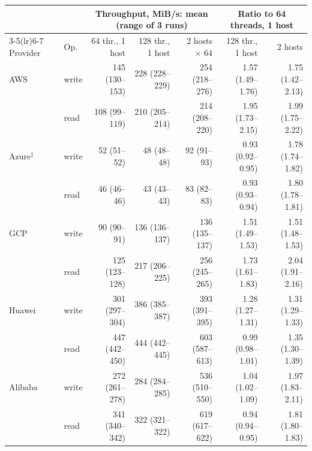 \begin{tabular}{llrrrrr}
\toprule
 & & \multicolumn{3}{c}{Throughput, MiB/s: mean (range of 3 runs)} & \multicolumn{2}{c}{Ratio to 64 threads, 1 host} \\
\cmidrule(lr){3-5}\cmidrule(lr){6-7}
Provider & Op. & 64 thr., 1 host & 128 thr., 1 host & 2 hosts $\times$ 64 & 128 thr., 1 host & 2 hosts \\
\midrule
AWS & write & 145 (130--153) & 228 (228--229) & 254 (218--276) & 1.57 (1.49--1.76) & 1.75 (1.42--2.13) \\
 & read & 108 (99--119) & 210 (205--214) & 214 (208--220) & 1.95 (1.73--2.15) & 1.99 (1.75--2.22) \\
Azure$^{\ddagger}$ & write & 52 (51--52) & 48 (48--48) & 92 (91--93) & 0.93 (0.92--0.95) & 1.78 (1.74--1.82) \\
 & read & 46 (46--46) & 43 (43--43) & 83 (82--83) & 0.93 (0.93--0.94) & 1.80 (1.78--1.81) \\
GCP & write & 90 (90--91) & 136 (136--137) & 136 (135--137) & 1.51 (1.49--1.53) & 1.51 (1.48--1.53) \\
 & read & 125 (123--128) & 217 (206--225) & 256 (245--265) & 1.73 (1.61--1.83) & 2.04 (1.91--2.16) \\
Huawei & write & 301 (297--304) & 386 (385--387) & 393 (391--395) & 1.28 (1.27--1.31) & 1.31 (1.29--1.33) \\
 & read & 447 (442--450) & 444 (442--445) & 603 (587--613) & 0.99 (0.98--1.01) & 1.35 (1.30--1.39) \\
Alibaba & write & 272 (261--278) & 284 (284--285) & 536 (510--550) & 1.04 (1.02--1.09) & 1.97 (1.83--2.11) \\
 & read & 341 (340--342) & 322 (321--322) & 619 (617--622) & 0.94 (0.94--0.95) & 1.81 (1.80--1.83) \\
\bottomrule
\end{tabular}
